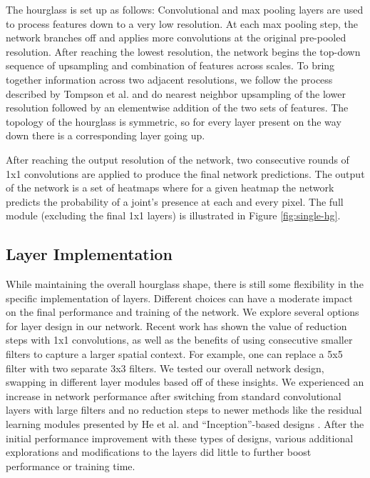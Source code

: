 \documentclass[runningheads]{llncs}
\begin{document}
The hourglass is set up as follows: Convolutional and max pooling
layers are used to process features down to a very low resolution. At
each max pooling step, the network branches off and applies more
convolutions at the original pre-pooled resolution. After reaching the
lowest resolution, the network begins the top-down sequence of
upsampling and combination of features across scales. To bring
together information across two adjacent resolutions, we follow the
process described by Tompson et al. \cite{tompson2014joint} and do
nearest neighbor upsampling of the lower resolution followed by an
elementwise addition of the two sets of features. The topology of the
hourglass is symmetric, so for every layer present on the way down
there is a corresponding layer going up.

After reaching the output resolution of the network, two consecutive
rounds of 1x1 convolutions are applied to produce the final network
predictions. The output of the network is a set of heatmaps where for
a given heatmap the network predicts the probability of a joint's
presence at each and every pixel. The full module (excluding the final
1x1 layers) is illustrated in Figure \ref{fig:single-hg}.

\subsection{Layer Implementation}

While maintaining the overall hourglass shape, there is still some
flexibility in the specific implementation of layers. Different
choices can have a moderate impact on the final performance and
training of the network. We explore several options for layer design
in our network. Recent work has shown the value of reduction steps
with 1x1 convolutions, as well as the benefits of using consecutive
smaller filters to capture a larger spatial context.\cite{he2015deep,
  szegedy2015going} For example, one can replace a 5x5 filter with two
separate 3x3 filters. We tested our overall network design, swapping
in different layer modules based off of these insights. We experienced
an increase in network performance after switching from standard
convolutional layers with large filters and no reduction steps to
newer methods like the residual learning modules presented by He et
al. \cite{he2015deep} and ``Inception''-based designs
\cite{szegedy2015going}. After the initial performance improvement
with these types of designs, various additional explorations and
modifications to the layers did little to further boost performance or
training time.
\end{document}

